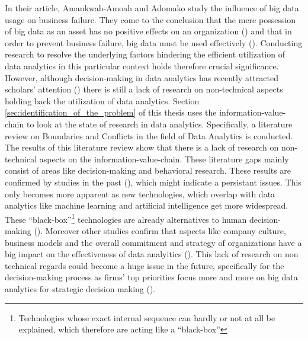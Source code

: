 In their article, Amankwah-Amoah and Adomako study the influence of big data usage on business failure. 
They come to the conclusion that the mere possession of big data as an asset has no positive effects on an organization (\cite{AmankwahAmoah.2019}) and that in order to prevent business failure, big data must be used effectively (\cite{AmankwahAmoah.2019}). Conducting research to resolve the underlying factors hindering the efficient utilization of data analytics in this particular context holds therefore crucial significance. However, although decision-making in data analytics has recently attracted scholars' attention (\cite{Chen.2022}) there is still a lack of research on non-technical aspects holding back the utilization of data analytics. Section \ref{sec:identification_of_the_problem} of this thesis uses the information-value-chain to look at the state of research in data analytics. Specifically, a literature review on Boundaries and Conflicts in the field of Data Analytics is conducted. The results of this literature review show that there is a lack of research on non-technical aspects on the information-value-chain. These literature gaps mainly consist of areas like decision-making and behavioral research. These results are confirmed by studies in the past (\cite{Trieu.2017}), which might indicate a persistant issues. This only becomes more apparent as new technologies, which overlap with data analytics like machine learning and artificial intelligence get more widespread. These \enquote{black-box}\footnote{Technologies whose exact internal sequence can hardly or not at all be explained, which therefore are acting like a \enquote{black-box}} technologies are already alternatives to human decision-making (\cite{Krakowski.2023}). Moreover other studies confirm that aspects like company culture, business models and the overall commitment and strategy of organizations have a big impact on the effectiveness of data analyitics (\cite{Holsapple.2014}). This lack of research on non technical regards could become a huge issue in the future, specifically for the decision-making process as firms' top priorities focus more and more on big data analytics for strategic decision making (\cite{Ghasemaghaei.2019}). 

